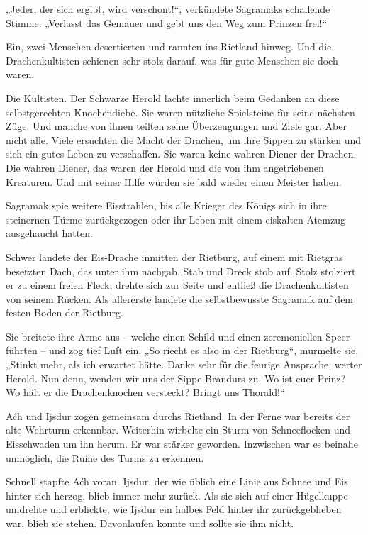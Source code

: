 „Jeder, der sich ergibt, wird verschont!“, verkündete Sagramaks schallende Stimme. „Verlasst das Gemäuer und gebt uns den Weg zum Prinzen frei!“

Ein, zwei Menschen desertierten und rannten ins Rietland hinweg. Und die Drachenkultisten schienen sehr stolz darauf, was für gute Menschen sie doch waren.

Die Kultisten. Der Schwarze Herold lachte innerlich beim Gedanken an diese selbstgerechten Knochendiebe. Sie waren nützliche Spielsteine für seine nächsten Züge. Und manche von ihnen teilten seine Überzeugungen und Ziele gar. Aber nicht alle. Viele ersuchten die Macht der Drachen, um ihre Sippen zu stärken und sich ein gutes Leben zu verschaffen. Sie waren keine wahren Diener der Drachen. Die wahren Diener, das waren der Herold und die von ihm angetriebenen Kreaturen. Und mit seiner Hilfe würden sie bald wieder einen Meister haben.

Sagramak spie weitere Eisstrahlen, bis alle Krieger des Königs sich in ihre steinernen Türme zurückgezogen oder ihr Leben mit einem eiskalten Atemzug ausgehaucht hatten.

Schwer landete der Eis-Drache inmitten der Rietburg, auf einem mit Rietgras besetzten Dach, das unter ihm nachgab. Stab und Dreck stob auf. Stolz stolziert er zu einem freien Fleck, drehte sich zur Seite und entließ die Drachenkultisten von seinem Rücken. Als allererste landete die selbstbewusste Sagramak auf dem festen Boden der Rietburg.

Sie breitete ihre Arme aus – welche einen Schild und einen zeremoniellen Speer führten – und zog tief Luft ein. „So riecht es also in der Rietburg“, murmelte sie, „Stinkt mehr, als ich erwartet hätte. Danke sehr für die feurige Ansprache, werter Herold. Nun denn, wenden wir uns der Sippe Brandurs zu. Wo ist euer Prinz? Wo hält er die Drachenknochen versteckt? Bringt uns Thorald!“



\trennzeichen



Aćh und Ijsdur zogen gemeinsam durchs Rietland. In der Ferne war bereits der alte Wehrturm erkennbar. Weiterhin wirbelte ein Sturm von Schneeflocken und Eisschwaden um ihn herum. Er war stärker geworden. Inzwischen war es beinahe unmöglich, die Ruine des Turms zu erkennen.

Schnell stapfte Aćh voran. Ijsdur, der wie üblich eine Linie aus Schnee und Eis hinter sich herzog, blieb immer mehr zurück. Als sie sich auf einer Hügelkuppe umdrehte und erblickte, wie Ijsdur ein halbes Feld hinter ihr zurückgeblieben war, blieb sie stehen. Davonlaufen konnte und sollte sie ihm nicht.

